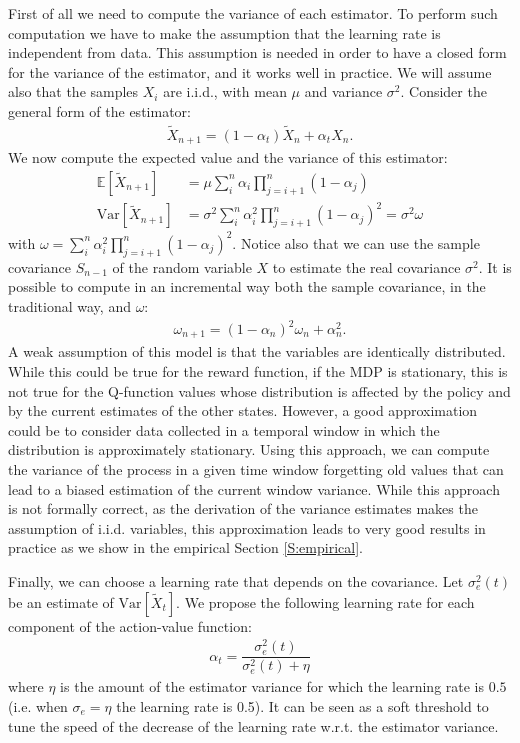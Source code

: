 \documentclass[conference]{IEEEtran}
\begin{document}
First of all we need to compute the variance of each estimator. To perform such computation we have to make the assumption that the learning rate is independent from data. This assumption is needed in order to have a closed form for the variance of the estimator, and it works well in practice. We will assume also that the samples $X_i$ are i.i.d., with mean $\mu$ and variance $\sigma^2$. Consider the general form of the estimator:
\begin{align}
 \widetilde{X}_{n+1} = (1-\alpha_t)\widetilde{X}_{n}+\alpha_tX_{n}.
\end{align}
We now compute the expected value and the variance of this estimator:
\begin{align}
 \mathbb{E}\left[\widetilde{X}_{n+1}\right]& = \mu\sum_i^n \alpha_i \prod_{j=i+1}^{n} \left(1-\alpha_j\right)\\
 \mathrm{Var}\left[\widetilde{X}_{n+1}\right]& = \sigma^2\sum_i^n \alpha_i^2 \prod_{j=i+1}^{n} \left(1-\alpha_j\right)^2 = \sigma^2\omega
\end{align}
with $\omega=\sum_i^n \alpha_i^2 \prod_{j=i+1}^{n} \left(1-\alpha_j\right)^2$. Notice also that we can use the sample covariance $S_{n-1}$ of the random variable $X$ to estimate the real covariance $\sigma^2$. It is possible to compute in an incremental way both the sample covariance, in the traditional way, and $\omega$:
\begin{align}
 \omega_{n+1}=(1-\alpha_n)^2\omega_n+\alpha_n^2.
\end{align}
A weak assumption of this model is that the variables are identically distributed. While this could be true for the reward function, if the MDP is stationary, this is not true for the Q-function values whose distribution is affected by the policy and by the current estimates of the other states. However, a good approximation could be to consider data collected in a temporal window in which the distribution is approximately stationary. Using this approach, we can compute the variance of the process in a given time window forgetting old values that can lead to a biased estimation of the current window variance. While this approach is not formally correct, as the derivation of the variance estimates makes the assumption of i.i.d. variables, this approximation leads to very good results in practice as we show in the empirical Section \ref{S:empirical}.

Finally, we can choose a learning rate that depends on the covariance. Let $\sigma_e^2(t)$ be an estimate of $\mathrm{Var}\left[\widetilde{X}_{t}\right]$. We propose the following learning rate for each component of the action-value function:
\begin{align}\label{eq:alpha_eq}
 \alpha_t=\dfrac{\sigma_e^2(t)}{\sigma_e^2(t)+\eta}
\end{align}
where $\eta$ is the amount of the estimator variance for which the learning rate is $0.5$ (i.e. when $\sigma_e=\eta$ the learning rate is 0.5). It can be seen as a soft threshold to tune the speed of the decrease of the learning rate w.r.t. the estimator variance.
\end{document}
